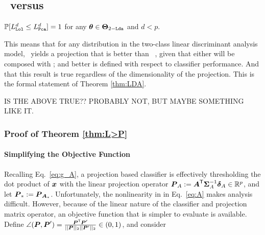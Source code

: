 \documentclass[10pt]{article}
\begin{document}
\subsection{\Pca~versus \Lol}


\begin{thm} \label{thm:L>P}
$\mathbb{P}[L_{{\sc \texttt{Lol}}}^d \leq L_{{\sc \texttt{Pca}}}^d]=1$ for any $\boldsymbol{\theta} \in \boldsymbol{\Theta}_{2-{\sc \texttt{Lda}}}$  and   $d < p$.
 \end{thm}

This means that for any distribution in the two-class linear discriminant analysis model, \Lol~yields a projection that is better than \Pca~, given that either will be composed with \Lda; and better is defined with respect to classifier performance.  And that this result is true regardless of the dimensionality of the projection.  This is the formal statement of Theorem \ref{thm:LDA}.

IS THE ABOVE TRUE?? PROBABLY NOT, BUT MAYBE SOMETHING LIKE IT.

\subsubsection{Proof of Theorem \ref{thm:L>P}}



\paragraph{Simplifying the Objective Function}

Recalling Eq.~\eqref{eq:g_A}, a projection based classifier is effectively thresholding the dot product of $\boldsymbol{x}$ with the linear projection operator $\boldsymbol{P}_A :=\boldsymbol{A}^{\mathsf{T}} \boldsymbol{\Sigma}_A^{-1} \boldsymbol{\delta}_A \in \mathbb{R}^p$, and let $\boldsymbol{P}_*:=\boldsymbol{P}_{\boldsymbol{A}_*}$.  Unfortunately, the nonlinearity in in Eq.~\eqref{eq:A} makes analysis difficult.
However, because of the linear nature of the classifier and projection matrix operator, an objective function that is simpler to evaluate is available.
Define 
$\angle(\boldsymbol{P},\boldsymbol{P}') = \frac{ \boldsymbol{P}^{\mathsf{T}} \boldsymbol{P}'}{||\boldsymbol{P}||_2 ||\boldsymbol{P}'||_2} \in (0,1)$, and consider
\end{document}
